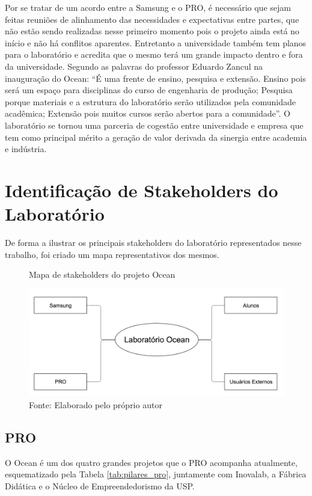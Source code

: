 Por se tratar de um acordo entre a Samsung e o PRO, é necessário que sejam feitas reuniões de alinhamento das necessidades e expectativas entre partes, que não estão sendo realizadas nesse primeiro momento pois o projeto ainda está no início e não há conflitos aparentes. Entretanto a universidade também tem planos para o laboratório e acredita que o mesmo terá um grande impacto dentro e fora da universidade. Segundo as palavras do professor Eduardo Zancul na inauguração do Ocean: “É uma frente de ensino, pesquisa e extensão. Ensino pois será um espaço para disciplinas do curso de engenharia de produção; Pesquisa porque materiais e a estrutura do laboratório serão utilizados pela comunidade acadêmica; Extensão pois muitos cursos serão abertos para a comunidade”. O laboratório se tornou uma parceria de cogestão entre universidade e empresa que tem como principal mérito a geração de valor derivada da sinergia entre academia e indústria. 

\section{Identificação de Stakeholders do Laboratório}
\label{sec:identificacao_stakeholders}

De forma a ilustrar os principais stakeholders do laboratório representados nesse trabalho, foi criado um mapa representativos dos mesmos. 

\begin{figure}[h]
\caption{Mapa de stakeholders do projeto Ocean}
\centerline{\includegraphics[scale=0.5]{img/stakeholders}}
\label{fig:stakeholders}
\caption* {Fonte: Elaborado pelo próprio autor}
\end{figure}

\subsection{PRO}
\label{sec:con_pro}

O Ocean é um dos quatro grandes projetos que o PRO acompanha atualmente, esquematizado pela Tabela \ref{tab:pilares_pro}, juntamente com Inovalab, a Fábrica Didática e o Núcleo de Empreendedorismo da USP.

